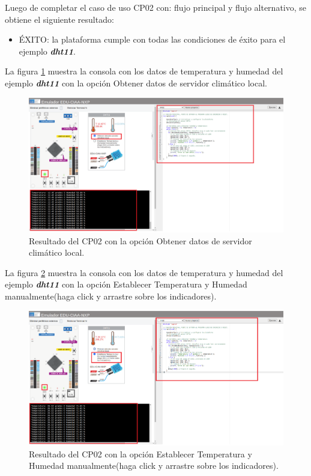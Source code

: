Luego de completar el caso de uso CP02 con: flujo principal y flujo alternativo, se obtiene el siguiente resultado: 

\begin{itemize}
	\item ÉXITO: la plataforma cumple con todas las condiciones de éxito para el ejemplo \textit{\textbf{dht11}}.
\end{itemize}

La figura \ref{fig:RespuestaEmulador_DHT11_1} muestra la consola con los datos de temperatura y humedad del ejemplo \textit{\textbf{dht11}} con la opción \textquotedbl Obtener datos de servidor climático local.\textquotedbl

\begin{figure}[ht]
	\centering
	\includegraphics[scale=.20]{./Figures/dht11Opcion1.png}
	\caption{Resultado del  CP02 con la opción \textquotedbl Obtener datos de servidor climático local.\textquotedbl}
	\label{fig:RespuestaEmulador_DHT11_1}
\end{figure}

La figura \ref{fig:RespuestaEmulador_DHT11_2} muestra la consola con los datos de temperatura y humedad del ejemplo \textit{\textbf{dht11}} con la opción \textquotedbl Establecer Temperatura y Humedad manualmente(haga click y arrastre sobre los indicadores).\textquotedbl

\begin{figure}[ht]
	\centering
	\includegraphics[scale=.20]{./Figures/dht11Opcion2.png}
	\caption{Resultado del CP02 con la opción \textquotedbl Establecer Temperatura y Humedad manualmente(haga click y arrastre sobre los indicadores).\textquotedbl}
	\label{fig:RespuestaEmulador_DHT11_2}
\end{figure}

